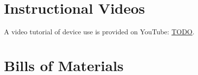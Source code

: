 \documentclass[11pt,a4paper]{article}
\begin{document}
\medskip




\newpage

\begin{appendices}

\section{Instructional Videos}\label{s:videos}

A video tutorial of device use is provided on YouTube: \url{TODO}.

\section{Bills of Materials}\label{s:boms}





\end{appendices}
\end{document}
